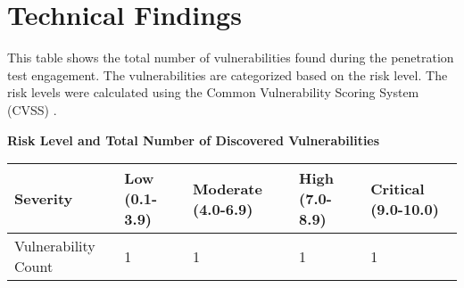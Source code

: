 \section{Technical Findings}
\label{sec:tech}
This table shows the total number of vulnerabilities found during the penetration test engagement. The vulnerabilities are categorized based on the risk level. The risk levels were calculated using the Common Vulnerability Scoring System (CVSS) \cite{cvssdocs}.

\begin{center}
\textbf{Risk Level and Total Number of Discovered Vulnerabilities}
\end{center}

\setlength\arrayrulewidth{1.25pt}

\begin{table}[h]
\renewcommand{\arraystretch}{2}
    \centering
    \begin{tabular}{|>{\large}p{11em}|>{\large}p{5em}|>{\large}p{5em}|>{\large}p{5em}|>{\large}p{6em}|}\hline
         Severity & \cellcolor{green}Low \newline (0.1-3.9) & \cellcolor{yellow}Moderate (4.0-6.9) & \cellcolor{orange}High (7.0-8.9) & \cellcolor{red}Critical (9.0-10.0)\\\hline
        Vulnerability Count& 1 & 1 & 1 & 1 \\\hline
    \end{tabular}
\end{table}

